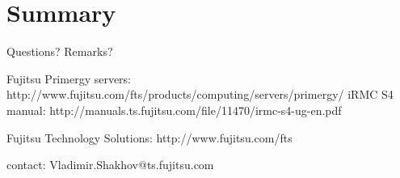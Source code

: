 \documentclass{beamer}
\begin{document}
\section*{Summary}
\begin{frame}{Questions? Remarks?}
  
  \begin{center}
  \end{center}

  \normalsize{Fujitsu Primergy servers: http://www.fujitsu.com/fts/products/computing/servers/primergy/ }
  \normalsize{iRMC S4 manual: http://manuals.ts.fujitsu.com/file/11470/irmc-s4-ug-en.pdf}
  
  \normalsize{Fujitsu Technology Solutions: http://www.fujitsu.com/fts}

  contact: Vladimir.Shakhov@ts.fujitsu.com


\end{frame}
\end{document}
